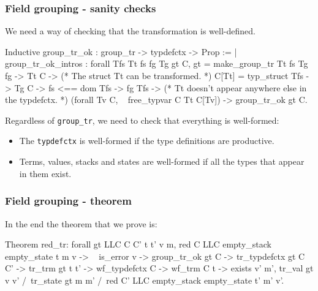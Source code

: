 \begin{frame}[fragile]
\frametitle{Field grouping - sanity checks}

We need a way of checking that the transformation is well-defined.

\begin{coqs}
Inductive group_tr_ok : group_tr -> typdefctx -> Prop :=
  | group_tr_ok_intros : forall Tfs Tt fs fg Tg gt C,
      gt = make_group_tr Tt fs Tg fg ->
      Tt \indom C ->
      (* The struct Tt can be transformed. *)
      C[Tt] = typ_struct Tfs ->
      Tg \notindom C ->
      fs <== dom Tfs ->
      fg \notindom Tfs ->
      (* Tt doesn't appear anywhere else in the typdefctx. *)
      (forall Tv \indom C, ~ free_typvar C Tt C[Tv]) ->
      group_tr_ok gt C.
\end{coqs}

\bigskip \pause

Regardless of \texttt{group\_tr}, we need to check that everything is well-formed:
\begin{itemize}
	\item The \texttt{typdefctx} is well-formed if the type definitions are productive. \pause
	\item Terms, values, stacks and states are well-formed if all the types that appear in them exist.
\end{itemize}

\end{frame}


\begin{frame}[fragile]
\frametitle{Field grouping - theorem}

In the end the theorem that we prove is:

\begin{coq}
Theorem red_tr: forall gt LLC C C' t t' v m,
  red C LLC empty_stack empty_state t m v ->
  ~ is_error v ->
  group_tr_ok gt C ->
  tr_typdefctx gt C C' ->
  tr_trm gt t t' ->
  wf_typdefctx C ->
  wf_trm C t ->
  exists v' m',		tr_val gt v v'
		 /\ tr_state gt m m'
		 /\ red C' LLC empty_stack empty_state t' m' v'.
\end{coq}

\end{frame}


